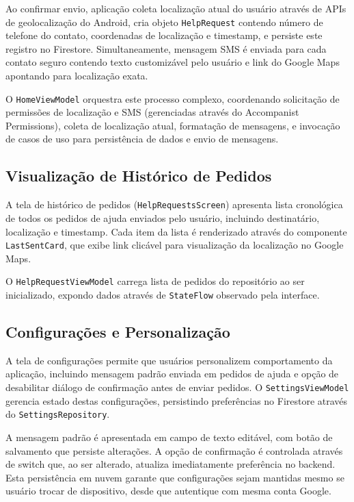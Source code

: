 Ao confirmar envio, aplicação coleta localização atual do usuário através de APIs de geolocalização do Android, cria objeto \texttt{HelpRequest} contendo número de telefone do contato, coordenadas de localização e timestamp, e persiste este registro no Firestore. Simultaneamente, mensagem SMS é enviada para cada contato seguro contendo texto customizável pelo usuário e link do Google Maps apontando para localização exata.

O \texttt{HomeViewModel} orquestra este processo complexo, coordenando solicitação de permissões de localização e SMS (gerenciadas através do Accompanist Permissions), coleta de localização atual, formatação de mensagens, e invocação de casos de uso para persistência de dados e envio de mensagens.

\subsection{Visualização de Histórico de Pedidos}
A tela de histórico de pedidos (\texttt{HelpRequestsScreen}) apresenta lista cronológica de todos os pedidos de ajuda enviados pelo usuário, incluindo destinatário, localização e timestamp. Cada item da lista é renderizado através do componente \texttt{LastSentCard}, que exibe link clicável para visualização da localização no Google Maps.

O \texttt{HelpRequestViewModel} carrega lista de pedidos do repositório ao ser inicializado, expondo dados através de \texttt{StateFlow} observado pela interface. 

\subsection{Configurações e Personalização}
A tela de configurações permite que usuários personalizem comportamento da aplicação, incluindo mensagem padrão enviada em pedidos de ajuda e opção de desabilitar diálogo de confirmação antes de enviar pedidos. O \texttt{SettingsViewModel} gerencia estado destas configurações, persistindo preferências no Firestore através do \texttt{SettingsRepository}.

A mensagem padrão é apresentada em campo de texto editável, com botão de salvamento que persiste alterações. A opção de confirmação é controlada através de switch que, ao ser alterado, atualiza imediatamente preferência no backend. Esta persistência em nuvem garante que configurações sejam mantidas mesmo se usuário trocar de dispositivo, desde que autentique com mesma conta Google.

